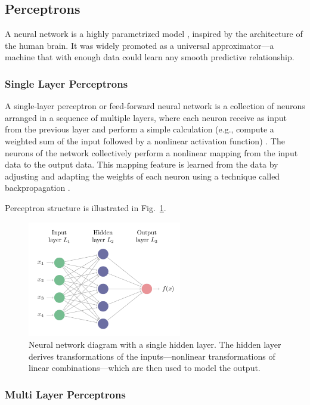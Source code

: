 \subsection{Perceptrons}

A neural network is a highly parametrized model \cite{efron2016computer}, inspired by the architecture of the human brain. It was widely promoted as a universal approximator—a machine that with enough data could learn any smooth predictive relationship.

\subsubsection*{Single Layer Perceptrons}

A single-layer perceptron or feed-forward neural network is a collection of neurons arranged in a sequence of multiple layers, where each neuron receive as input from the previous layer and perform a simple calculation (e.g., compute a weighted sum of the input followed by a nonlinear activation function) \cite{efron2016computer}. The neurons of the network collectively perform a nonlinear mapping from the input data to the output data. This mapping feature is learned from the data by adjusting and adapting the weights of each neuron using a technique called backpropagation \cite{efron2016computer}.

Perceptron structure is illustrated in Fig.~\ref{fig:perceptron}.

\begin{figure}[htbp]
\centering
\includegraphics[width=0.6\textwidth]{images/perceptron.png}
\caption{Neural network diagram with a single hidden layer. The hidden layer derives transformations of the inputs—nonlinear transformations of linear combinations—which are then used to model the output.}
\label{fig:perceptron}
\end{figure}

\subsubsection*{Multi Layer Perceptrons}

